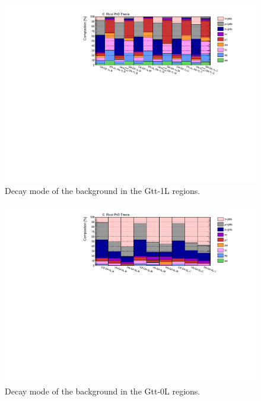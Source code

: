 \begin{figure}[htbp]
\includegraphics[width=\textwidth]{figures/Chap8/Rizzi-Fig8-13.pdf}
\caption{Decay mode of the \ttbar background in the Gtt-1L regions.}
	\label{fig:ttcomp_Gtt1L}
\end{figure}

\begin{figure}[htbp]
\includegraphics[width=\textwidth]{figures/Chap8/Rizzi-Fig8-14.pdf}
\caption{Decay mode of the \ttbar background in the Gtt-0L regions.}
	\label{fig:ttcomp_Gtt0L}
\end{figure}

